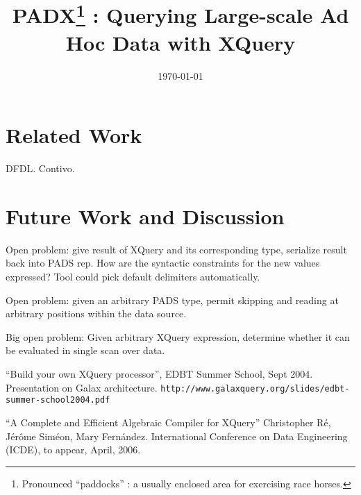 \documentclass[preprint]{sigplanconf}
\title{PADX\footnote{Pronounced ``paddocks'' : a usually enclosed area
for exercising race horses.} : Querying Large-scale Ad Hoc Data with XQuery}
\date{\today}
\begin{document}
\maketitle
\begin{abstract}
\end{abstract}







\section{Related Work}
\label{section:relatedwork}

DFDL. Contivo. 

\section{Future Work and Discussion}
\label{section:future}
Open problem: give result of XQuery and its corresponding type,
serialize result back into PADS rep.  How are the syntactic
constraints for the new values expressed?  Tool could pick default
delimiters automatically. 

Open problem: given an arbitrary PADS type, permit skipping and
reading at arbitrary positions within the data source. 

Big open problem: Given arbitrary XQuery expression, determine whether
it can be evaluated in single scan over data.  

``Build your own {XQuery} processor'', EDBT Summer School, Sept
2004. Presentation on Galax architecture.
\texttt{http://www.galaxquery.org/slides/edbt-summer-school2004.pdf}

``A Complete and Efficient Algebraic Compiler for XQuery''
Christopher R\'e, J\'er\^ome Sim\'eon, Mary Fern\'andez.
International Conference on Data Engineering (ICDE), to appear, April,
2006.


\small
 
\end{document}
